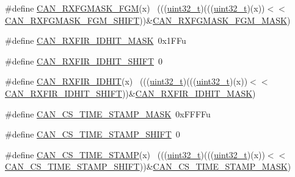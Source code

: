\begin{DoxyCompactItemize}
\item 
\#define \hyperlink{group___c_a_n___register___masks_gab9f806f5a8e9cd528fe08688ef1794e5}{C\+A\+N\+\_\+\+R\+X\+F\+G\+M\+A\+S\+K\+\_\+\+F\+GM}(x)                                        ~(((\hyperlink{_p_e___types_8h_a33594304e786b158f3fb30289278f5af}{uint32\+\_\+t})(((\hyperlink{_p_e___types_8h_a33594304e786b158f3fb30289278f5af}{uint32\+\_\+t})(x))$<$$<$\hyperlink{group___c_a_n___register___masks_ga65e590b20d692e367f4ee9dc8a4585e2}{C\+A\+N\+\_\+\+R\+X\+F\+G\+M\+A\+S\+K\+\_\+\+F\+G\+M\+\_\+\+S\+H\+I\+FT}))\&\hyperlink{group___c_a_n___register___masks_ga5db0253c73d24a846f3f3ce6cd67e74c}{C\+A\+N\+\_\+\+R\+X\+F\+G\+M\+A\+S\+K\+\_\+\+F\+G\+M\+\_\+\+M\+A\+SK})
\item 
\#define \hyperlink{group___c_a_n___register___masks_ga097ddfd77b23ddd23341d8ea269ce64b}{C\+A\+N\+\_\+\+R\+X\+F\+I\+R\+\_\+\+I\+D\+H\+I\+T\+\_\+\+M\+A\+SK}~0x1\+F\+Fu
\item 
\#define \hyperlink{group___c_a_n___register___masks_ga6a1b5e43de75851c0bdc5690c1715a14}{C\+A\+N\+\_\+\+R\+X\+F\+I\+R\+\_\+\+I\+D\+H\+I\+T\+\_\+\+S\+H\+I\+FT}~0
\item 
\#define \hyperlink{group___c_a_n___register___masks_gadffc40bb06741a25f5370981de441db3}{C\+A\+N\+\_\+\+R\+X\+F\+I\+R\+\_\+\+I\+D\+H\+IT}(x)                                          ~(((\hyperlink{_p_e___types_8h_a33594304e786b158f3fb30289278f5af}{uint32\+\_\+t})(((\hyperlink{_p_e___types_8h_a33594304e786b158f3fb30289278f5af}{uint32\+\_\+t})(x))$<$$<$\hyperlink{group___c_a_n___register___masks_ga6a1b5e43de75851c0bdc5690c1715a14}{C\+A\+N\+\_\+\+R\+X\+F\+I\+R\+\_\+\+I\+D\+H\+I\+T\+\_\+\+S\+H\+I\+FT}))\&\hyperlink{group___c_a_n___register___masks_ga097ddfd77b23ddd23341d8ea269ce64b}{C\+A\+N\+\_\+\+R\+X\+F\+I\+R\+\_\+\+I\+D\+H\+I\+T\+\_\+\+M\+A\+SK})
\item 
\#define \hyperlink{group___c_a_n___register___masks_ga70e77ee06fb6bf69b46020d1e3b91819}{C\+A\+N\+\_\+\+C\+S\+\_\+\+T\+I\+M\+E\+\_\+\+S\+T\+A\+M\+P\+\_\+\+M\+A\+SK}~0x\+F\+F\+F\+Fu
\item 
\#define \hyperlink{group___c_a_n___register___masks_gaa9e77f6476678316f4bedf1b02afe0d0}{C\+A\+N\+\_\+\+C\+S\+\_\+\+T\+I\+M\+E\+\_\+\+S\+T\+A\+M\+P\+\_\+\+S\+H\+I\+FT}~0
\item 
\#define \hyperlink{group___c_a_n___register___masks_ga961d23351bf7a73fc6b00c69466eb4c4}{C\+A\+N\+\_\+\+C\+S\+\_\+\+T\+I\+M\+E\+\_\+\+S\+T\+A\+MP}(x)                                      ~(((\hyperlink{_p_e___types_8h_a33594304e786b158f3fb30289278f5af}{uint32\+\_\+t})(((\hyperlink{_p_e___types_8h_a33594304e786b158f3fb30289278f5af}{uint32\+\_\+t})(x))$<$$<$\hyperlink{group___c_a_n___register___masks_gaa9e77f6476678316f4bedf1b02afe0d0}{C\+A\+N\+\_\+\+C\+S\+\_\+\+T\+I\+M\+E\+\_\+\+S\+T\+A\+M\+P\+\_\+\+S\+H\+I\+FT}))\&\hyperlink{group___c_a_n___register___masks_ga70e77ee06fb6bf69b46020d1e3b91819}{C\+A\+N\+\_\+\+C\+S\+\_\+\+T\+I\+M\+E\+\_\+\+S\+T\+A\+M\+P\+\_\+\+M\+A\+SK})
$$
\end{DoxyCompactItemize}
